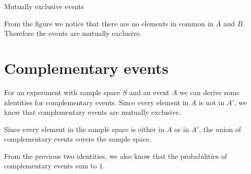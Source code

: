\begin{wex}{Mutually exclusive events}
{  

  From the figure we notice that there are no elements in common in
  $A$ and $B$. Therefore the events are mutually exclusive.
}

\end{wex}

\section{Complementary events}


For an experiment with sample space $S$ and an event $A$ we can derive
some identities for complementary events. Since every element in $A$ is not in $A'$, we know
  that complementary events are mutually exclusive.


Since every element in the sample space is either in $A$ or in
  $A'$, the union of complementary events covers the
  sample space.

From the previous two identities, we also know that the
  probabilities of complementary events sum to $1$.

